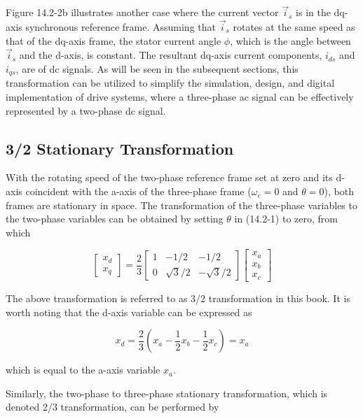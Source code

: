 \documentclass[letterpaper,12pt]{article}
\begin{document}
Figure 14.2-2b illustrates another case where the current vector $\vec{i}_s$ is in the dq-axis synchronous reference frame. Assuming that $\vec{i}_s$ rotates at the same speed as that of the dq-axis frame, the stator current angle $\phi$, which is the angle between $\vec{i}_s$ and the d-axis, is constant. The resultant dq-axis current components, $i_{ds}$ and $i_{qs}$, are of dc signals. As will be seen in the subsequent sections, this transformation can be utilized to simplify the simulation, design, and digital implementation of drive systems, where a three-phase ac signal can be effectively represented by a two-phase dc signal.

\subsection{3/2 Stationary Transformation}

With the rotating speed of the two-phase reference frame set at zero and its d-axis coincident with the a-axis of the three-phase frame ($\omega_e = 0$ and $\theta = 0$), both frames are stationary in space. The transformation of the three-phase variables to the two-phase variables can be obtained by setting $\theta$ in (14.2-1) to zero, from which

\begin{equation}
\begin{bmatrix}
x_d \\
x_q
\end{bmatrix}
=
\frac{2}{3}
\begin{bmatrix}
1 & -1/2 & -1/2 \\
0 & \sqrt{3}/2 & -\sqrt{3}/2
\end{bmatrix}
\begin{bmatrix}
x_a \\
x_b \\
x_c
\end{bmatrix} \tag{14.2-6}
\end{equation}

The above transformation is referred to as 3/2 transformation in this book. It is worth noting that the d-axis variable can be expressed as

\begin{equation}
x_d = \frac{2}{3} \left( x_a - \frac{1}{2}x_b - \frac{1}{2}x_c \right) = x_a \tag{14.2-7}
\end{equation}

which is equal to the a-axis variable $x_a$.

Similarly, the two-phase to three-phase stationary transformation, which is denoted 2/3 transformation, can be performed by
\end{document}

